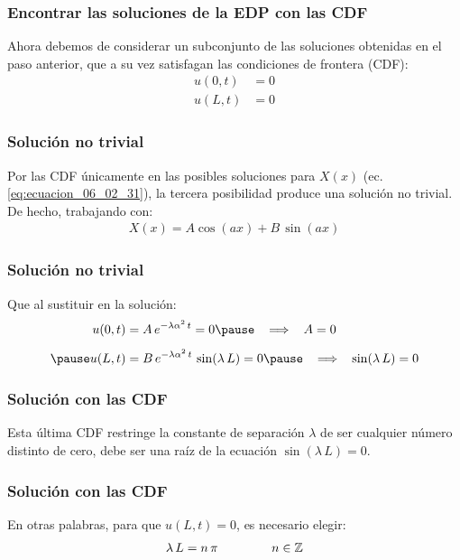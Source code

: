 \documentclass[12pt]{beamer}
\begin{document}
\begin{frame}
\frametitle{Encontrar las soluciones de la EDP con las CDF}
Ahora debemos de considerar un subconjunto de las soluciones obtenidas en el paso anterior, que a su vez satisfagan las condiciones de frontera (CDF):
\pause
\begin{align*}
u (0, t) &= 0 \\[0.5em]
u (L, t) &= 0
\end{align*}
\end{frame}
\begin{frame}
\frametitle{Solución no trivial}
Por las CDF únicamente en las posibles soluciones para $X(x)$ (ec. \ref{eq:ecuacion_06_02_31}), la tercera posibilidad produce una solución no trivial. De hecho, trabajando con:
\pause
\begin{align*}
X (x) = A \cos (a x) + B \, \sin (a x)
\end{align*}
\end{frame}
\begin{frame}
\frametitle{Solución no trivial}
Que al sustituir en la solución:
\pause
\begin{eqnarray*}
\begin{aligned}
u (0, t) &= A \, e^{-\lambda \alpha^{2} \, t} = 0 \pause \hspace{0.3cm} \Longrightarrow \hspace{0.3cm} A = 0 \\[0.5em] \pause
u (L, t) &= B \, e^{-\lambda \alpha^{2} \, t} \, \sin (\lambda \, L) = 0 \pause \hspace{0.3cm} \Longrightarrow \hspace{0.3cm} \sin (\lambda \, L) = 0
\end{aligned}
\end{eqnarray*}
\end{frame}
\begin{frame}
\frametitle{Solución con las CDF}
Esta última CDF restringe la constante de separación $\lambda$ de ser cualquier número distinto de cero, debe ser una raíz de la ecuación $\sin (\lambda \, L) = 0$.
\end{frame}
\begin{frame}
\frametitle{Solución con las CDF}
En otras palabras, para que $u(L, t) = 0$, es necesario elegir:
\pause
\begin{align}
\lambda \, L = n \, \pi \hspace{1.5cm} n \in \mathbb{Z}
\label{eq:ecuacion_06_02_34}    
\end{align}
\end{frame}
\end{document}
